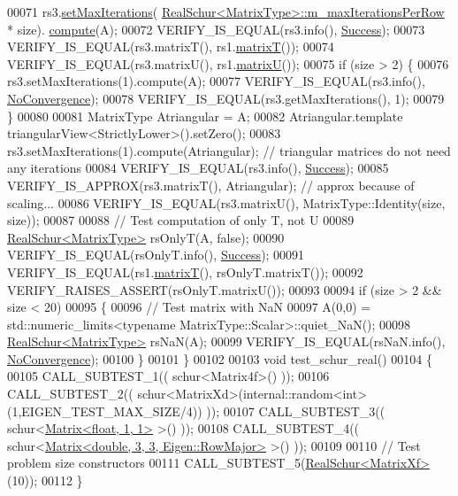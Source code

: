 \begin{DoxyCode}
00071   rs3.\hyperlink{group___eigenvalues___module_ad189e8776ee20a12046694f98b354322}{setMaxIterations}(
      \hyperlink{group___eigenvalues___module_class_eigen_1_1_real_schur}{RealSchur<MatrixType>::m\_maxIterationsPerRow} * size).
      \hyperlink{group___eigenvalues___module_a60caf9ffad11d728ea458c4dd36d0a98}{compute}(A);
00072   VERIFY\_IS\_EQUAL(rs3.info(), \hyperlink{group__enums_gga85fad7b87587764e5cf6b513a9e0ee5ea52581b035f4b59c203b8ff999ef5fcea}{Success});
00073   VERIFY\_IS\_EQUAL(rs3.matrixT(), rs1.\hyperlink{group___eigenvalues___module_abb78996b43b8642a5f507415730445cb}{matrixT}());
00074   VERIFY\_IS\_EQUAL(rs3.matrixU(), rs1.\hyperlink{group___eigenvalues___module_a85622ccbecff99c8933d21f0a22b22bb}{matrixU}());
00075   \textcolor{keywordflow}{if} (size > 2) \{
00076     rs3.setMaxIterations(1).compute(A);
00077     VERIFY\_IS\_EQUAL(rs3.info(), \hyperlink{group__enums_gga85fad7b87587764e5cf6b513a9e0ee5eaba1c8763d1179778070f365ecc4157a8}{NoConvergence});
00078     VERIFY\_IS\_EQUAL(rs3.getMaxIterations(), 1);
00079   \}
00080 
00081   MatrixType Atriangular = A;
00082   Atriangular.template triangularView<StrictlyLower>().setZero(); 
00083   rs3.setMaxIterations(1).compute(Atriangular); \textcolor{comment}{// triangular matrices do not need any iterations}
00084   VERIFY\_IS\_EQUAL(rs3.info(), \hyperlink{group__enums_gga85fad7b87587764e5cf6b513a9e0ee5ea52581b035f4b59c203b8ff999ef5fcea}{Success});
00085   VERIFY\_IS\_APPROX(rs3.matrixT(), Atriangular); \textcolor{comment}{// approx because of scaling...}
00086   VERIFY\_IS\_EQUAL(rs3.matrixU(), MatrixType::Identity(size, size));
00087 
00088   \textcolor{comment}{// Test computation of only T, not U}
00089   \hyperlink{group___eigenvalues___module}{RealSchur<MatrixType>} rsOnlyT(A, \textcolor{keyword}{false});
00090   VERIFY\_IS\_EQUAL(rsOnlyT.info(), \hyperlink{group__enums_gga85fad7b87587764e5cf6b513a9e0ee5ea52581b035f4b59c203b8ff999ef5fcea}{Success});
00091   VERIFY\_IS\_EQUAL(rs1.\hyperlink{group___eigenvalues___module_abb78996b43b8642a5f507415730445cb}{matrixT}(), rsOnlyT.matrixT());
00092   VERIFY\_RAISES\_ASSERT(rsOnlyT.matrixU());
00093 
00094   \textcolor{keywordflow}{if} (size > 2 && size < 20)
00095   \{
00096     \textcolor{comment}{// Test matrix with NaN}
00097     A(0,0) = std::numeric\_limits<typename MatrixType::Scalar>::quiet\_NaN();
00098     \hyperlink{group___eigenvalues___module}{RealSchur<MatrixType>} rsNaN(A);
00099     VERIFY\_IS\_EQUAL(rsNaN.info(), \hyperlink{group__enums_gga85fad7b87587764e5cf6b513a9e0ee5eaba1c8763d1179778070f365ecc4157a8}{NoConvergence});
00100   \}
00101 \}
00102 
00103 \textcolor{keywordtype}{void} test\_schur\_real()
00104 \{
00105   CALL\_SUBTEST\_1(( schur<Matrix4f>() ));
00106   CALL\_SUBTEST\_2(( schur<MatrixXd>(internal::random<int>(1,EIGEN\_TEST\_MAX\_SIZE/4)) ));
00107   CALL\_SUBTEST\_3(( schur<\hyperlink{group___core___module_class_eigen_1_1_matrix}{Matrix<float, 1, 1>} >() ));
00108   CALL\_SUBTEST\_4(( schur<\hyperlink{group___core___module_class_eigen_1_1_matrix}{Matrix<double, 3, 3, Eigen::RowMajor>} >() ));
00109 
00110   \textcolor{comment}{// Test problem size constructors}
00111   CALL\_SUBTEST\_5(\hyperlink{group___eigenvalues___module_class_eigen_1_1_real_schur}{RealSchur<MatrixXf>}(10));
00112 \}
\end{DoxyCode}
